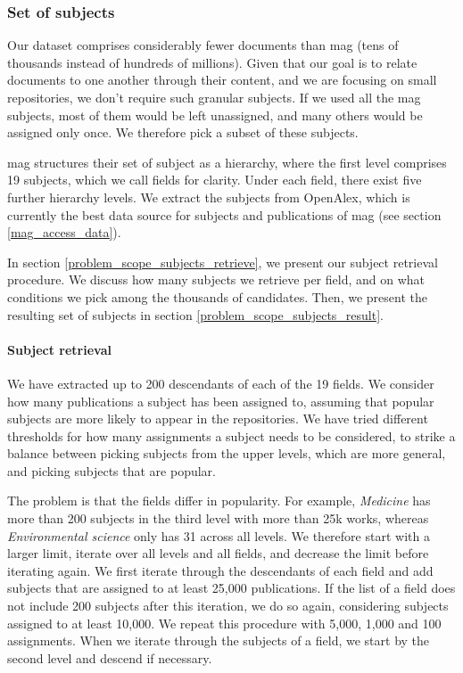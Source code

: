 \subsubsection{Set of subjects} \label{problem_scope_subjects}

Our dataset comprises considerably fewer documents than \acrshort{mag} (tens of thousands instead of hundreds of millions). Given that our goal is to relate documents to one another through their content, and we are focusing on small repositories, we don't require such granular subjects. If we used all the \acrshort{mag} subjects, most of them would be left unassigned, and many others would be assigned only once. We therefore pick a subset of these subjects.

\acrshort{mag} structures their set of subject as a hierarchy, where the first level comprises 19 subjects, which we call fields for clarity. Under each field, there exist five further hierarchy levels. We extract the subjects from OpenAlex, which is currently the best data source for subjects and publications of \acrshort{mag} (see section \ref{mag_access_data}).

In section \ref{problem_scope_subjects_retrieve}, we present our subject retrieval procedure. We discuss how many subjects we retrieve per field, and on what conditions we pick among the thousands of candidates. Then, we present the resulting set of subjects in section \ref{problem_scope_subjects_result}.

\paragraph{Subject retrieval} \mbox{} \label{problem_scope_subjects_retrieve}

We have extracted up to 200 descendants of each of the 19 fields. We consider how many publications a subject has been assigned to, assuming that popular subjects are more likely to appear in the repositories. We have tried different thresholds for how many assignments a subject needs to be considered, to strike a balance between picking subjects from the upper levels, which are more general, and picking subjects that are popular.

The problem is that the fields differ in popularity. For example, \textit{Medicine} has more than 200 subjects in the third level with more than 25k works, whereas \textit{Environmental science} only has 31 across all levels. We therefore start with a larger limit, iterate over all levels and all fields, and decrease the limit before iterating again. We first iterate through the descendants of each field and add subjects that are assigned to at least 25,000 publications. If the list of a field does not include 200 subjects after this iteration, we do so again, considering subjects assigned to at least 10,000. We repeat this procedure with 5,000, 1,000 and 100 assignments. When we iterate through the subjects of a field, we start by the second level and descend if necessary.

